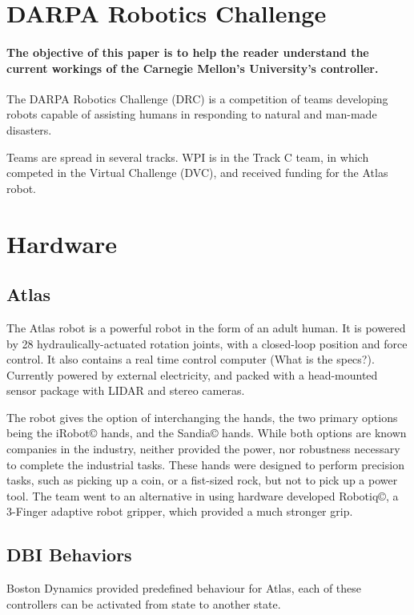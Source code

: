 \documentclass{article}
\begin{document}
\pagebreak

\section{DARPA Robotics Challenge}
\paragraph{The objective of this paper is to help the reader understand the current workings of the Carnegie Mellon’s University’s controller.}  
 
The DARPA Robotics Challenge (DRC) is a competition of teams developing robots capable of assisting humans in responding to natural and man-made disasters.   
 
Teams are spread in several tracks. WPI is in the Track C team, in which competed in the Virtual Challenge (DVC), and received funding for the Atlas robot.  

\section{Hardware}
\subsection{Atlas}

The Atlas robot is a powerful robot in the form of an adult human. It is powered by 28 hydraulically-actuated rotation joints, with a closed-loop position and force control. It also contains a real time control computer (What is the specs?). Currently powered by external electricity, and packed with a head-mounted sensor package with LIDAR and stereo cameras. 

The robot gives the option of interchanging the hands, the two primary options being the iRobot© hands, and the Sandia© hands. While both options are known companies in the industry, neither provided the power, nor robustness necessary to complete the industrial tasks. These hands were designed to perform precision tasks, such as picking up a coin, or a fist-sized rock, but not to pick up a power tool. The team went to an alternative in using hardware developed Robotiq©, a 3-Finger adaptive robot gripper, which provided a much stronger grip. 

\subsection{DBI Behaviors}
Boston Dynamics provided predefined behaviour for Atlas, each of these controllers can be activated from state to another state. 
\end{document}
